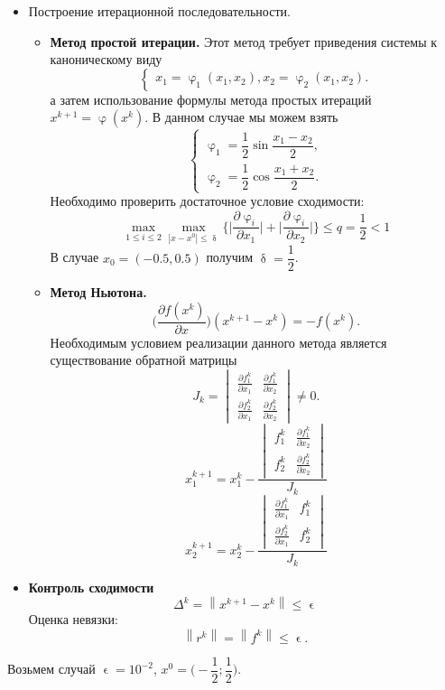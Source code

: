 \documentclass[a4paper, 12pt]{article}
\renewcommand{\leq}{\leqslant}
\renewcommand{\delta}{\updelta}
\renewcommand{\varphi}{\upvarphi}
\renewcommand{\phi}{\upvarphi}
\renewcommand{\d}{\partial}
\renewcommand{\epsilon}{\upvarepsilon}
\newcommand\Norm[1]{\left\| #1 \right\|}
\begin{document}
\begin{itemize}
\begin{itemize}
		\end{itemize}
		\item Построение итерационной последовательности. 
		\begin{itemize}
			\item \textbf{Метод простой итерации.}
			Этот метод требует приведения системы к каноническому виду
			$$\begin{cases}
				x_1 = \varphi_1(x_1,x_2),
				x_2 = \varphi_2(x_1,x_2).
			\end{cases}$$
			а затем использование формулы метода простых итераций $x^{k+1} = \varphi(x^k)$. В данном случае мы можем взять $$\begin{cases}
			\varphi_1 = \dfrac{1}{2}\sin \dfrac{x_1-x_2}{2},\\
			\varphi_2 = \dfrac{1}{2}\cos \dfrac{x_1+x_2}{2}.
			\end{cases}$$
			Необходимо проверить достаточное условие сходимости:
			$$\underset{1\leq i \leq 2}{\max}\underset{|x-x^0|\leq \delta }{\max}\{\Big|\dfrac{\d \phi_i}{\d x_1}\Big| + \Big|\dfrac{\d \phi_i}{\d x_2}\Big|\}\leq q = \dfrac{1}{2}< 1$$
			В случае $x_0 = (-0.5, 0.5)$ получим $\delta = \dfrac{1}{2}$.
			\item \textbf{Метод Ньютона.}
			$$\Big(\dfrac{\d f(x^k)}{\d x}\Big)(x^{k+1} - x^k) = -f(x^k).$$
			Необходимым условием реализации данного метода является существование обратной матрицы $$J_k = \begin{vmatrix}
			\frac{\d f_1^k}{\d x_1} & \frac{\d f_1^k}{\d x_2}\\
			\frac{\d f_2^k}{\d x_1} & \frac{\d f_2^k}{\d x_2}			\end{vmatrix}\ne 0.$$
			$$x_1^{k+1} = x_1^k - \dfrac{\begin{vmatrix}
					f_1^k & \frac{\d f_1^k}{\d x_2} \\ f_2^k& \frac{\d f_2^k}{\d x_2} 
			\end{vmatrix}}{J_k}$$
		$$x_2^{k+1} = x_2^k - \dfrac{\begin{vmatrix}
				\frac{\d f_1^k}{\d x_1}&f_1^k  \\ \frac{\d f_2^k}{\d x_1} &f_2^k
		\end{vmatrix}}{J_k}$$
		\end{itemize}
		\item \textbf{Контроль сходимости}
		$$\Delta ^k = \Norm {x^{k+1} - x^k} \leq \epsilon$$
		Оценка невязки:
		$$\Norm{r^k} = \Norm {f^k} \leq \epsilon.$$
	\end{itemize}
	Возьмем случай $\epsilon = 10^{-2}$, $x^0 = \Big(-\dfrac{1}{2}; \dfrac{1}{2}\Big)$.
\end{document}
